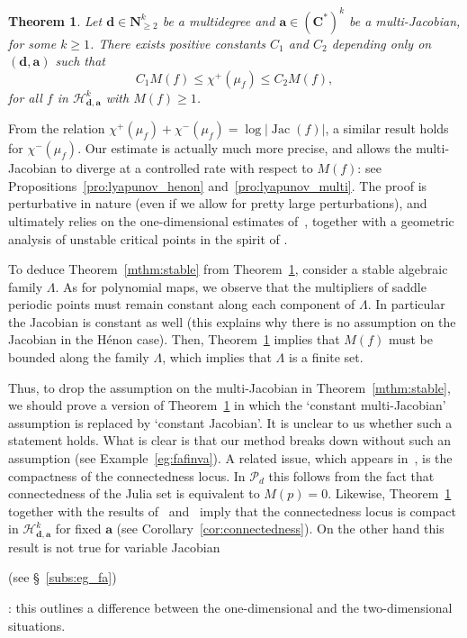 \documentclass[oneside, 12pt]{amsart}
\newcommand{\abs}[1]{\left\vert#1\right\vert}
\DeclareMathOperator{\jac}{Jac}
\newcommand{\C}{\mathbf{C}}
\newcommand{\N}{\mathbf{N}}
\theoremstyle{plain}
\newtheorem{mthm}{Theorem}
\theoremstyle{definition}
\numberwithin{equation}{section}       %
\numberwithin{equation}{section}       %
\begin{document}
 
\begin{mthm}\label{mthm:lyapunov}
 Let  $\mathbf d\in \N_{\geq 2}^k$ be a multidegree and $\mathbf a\in (\C^*)^k$ be a multi-Jacobian, for some $k\geq 1$.
There exists  positive constants $C_1$ and $C_2$
 depending only on $(\mathbf d, \mathbf a)$
  such that  
$$ C_1M(f)\leq  \chi^+(\mu_f)\leq  C_2 M(f), $$
for all  $f$    in $ \mathcal H^k_{\mathbf d,\mathbf a}$ with $M(f)\geq 1$.
\end{mthm}

From the relation $\chi^+(\mu_f) + \chi^-(\mu_f) = \log\abs{\jac(f)}$, 
  a similar result  holds for  $\chi^-(\mu_f)$. 
Our estimate is actually  much more precise, and      allows the 
multi-Jacobian to diverge at a controlled rate with respect to $M(f)$: see Propositions~\ref{pro:lyapunov_henon}  and~\ref{pro:lyapunov_multi}. 
The proof is perturbative in nature  (even if we allow for pretty large perturbations), 
and ultimately relies on the one-dimensional estimates of~\cite{branner-hubbard1}, together with  
a geometric analysis of unstable critical points in the spirit of \cite{lyapunov}.




To deduce Theorem~\ref{mthm:stable} from Theorem~\ref{mthm:lyapunov},  consider a stable 
  algebraic family $\Lambda$. As for polynomial maps, we observe that 
the multipliers of saddle periodic points must remain constant along each component of  $\Lambda$. 
In particular the Jacobian is constant as well (this explains why there is no assumption on the Jacobian in the Hénon case). 
Then, Theorem~\ref{mthm:lyapunov} implies that $M(f)$ must be bounded along the family  
$\Lambda$, which 
implies that $\Lambda$ is a finite set. 

  
Thus, to drop the assumption on the multi-Jacobian in Theorem~\ref{mthm:stable}, we should prove a version of Theorem~\ref{mthm:lyapunov} in which the `constant multi-Jacobian' assumption is replaced by `constant Jacobian'. 
It is unclear to us whether  such a statement holds. 
What is clear is that our method breaks down 
without such an assumption (see Example~\ref{eg:fafinva}). 
A related issue, which  appears in~\cite{branner-hubbard1}, is  
the compactness of the connectedness locus. 
In $\mathcal P_d$ this follows from the   fact that connectedness of the Julia set is equivalent to $M(p)=0$. 
Likewise,
Theorem~\ref{mthm:lyapunov} together with the results of~\cite{bs6} and~\cite{connex} imply that 
the connectedness locus is compact in $\mathcal H^k_{\mathbf d,\mathbf a}$ for fixed $\mathbf a$
(see Corollary~\ref{cor:connectedness}).  
On the other hand this result is not  true for variable Jacobian  
\begin{vlongue}
(see \S~\ref{subs:eg_fa})
\end{vlongue}
: this outlines a difference between the one-dimensional and the two-dimensional situations.  
 
\end{document}
